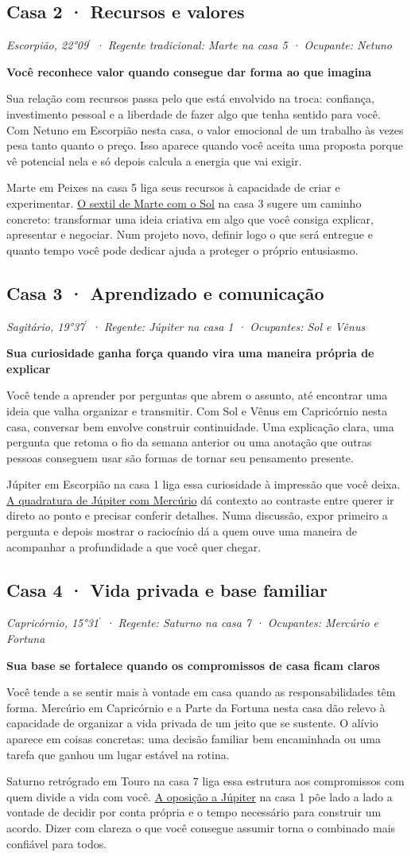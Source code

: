 \documentclass[11pt,a4paper]{article}
\newcommand{\leitura}[3]{\subsection{#1}\textit{#2}\par #3}
\newcommand{\subtituloleitura}[1]{\textbf{#1}\par\nopagebreak[4]}
\newcommand{\aspectoref}[2]{\hyperref[#1]{#2}}
\begin{document}
\leitura{Casa 2 · Recursos e valores}{Escorpião, 22°09\ensuremath{^{\prime}} · Regente tradicional: Marte na casa 5 · Ocupante: Netuno}{
\subtituloleitura{Você reconhece valor quando consegue dar forma ao que imagina}
Sua relação com recursos passa pelo que está envolvido na troca: confiança, investimento pessoal e a liberdade de fazer algo que tenha sentido para você. Com Netuno em Escorpião nesta casa, o valor emocional de um trabalho às vezes pesa tanto quanto o preço. Isso aparece quando você aceita uma proposta porque vê potencial nela e só depois calcula a energia que vai exigir.

Marte em Peixes na casa 5 liga seus recursos à capacidade de criar e experimentar. \aspectoref{aspecto:sol-marte}{O sextil de Marte com o Sol} na casa 3 sugere um caminho concreto: transformar uma ideia criativa em algo que você consiga explicar, apresentar e negociar. Num projeto novo, definir logo o que será entregue e quanto tempo você pode dedicar ajuda a proteger o próprio entusiasmo.
}

\leitura{Casa 3 · Aprendizado e comunicação}{Sagitário, 19°37\ensuremath{^{\prime}} · Regente: Júpiter na casa 1 · Ocupantes: Sol e Vênus}{
\subtituloleitura{Sua curiosidade ganha força quando vira uma maneira própria de explicar}
Você tende a aprender por perguntas que abrem o assunto, até encontrar uma ideia que valha organizar e transmitir. Com Sol e Vênus em Capricórnio nesta casa, conversar bem envolve construir continuidade. Uma explicação clara, uma pergunta que retoma o fio da semana anterior ou uma anotação que outras pessoas conseguem usar são formas de tornar seu pensamento presente.

Júpiter em Escorpião na casa 1 liga essa curiosidade à impressão que você deixa. \aspectoref{aspecto:mercurio-jupiter}{A quadratura de Júpiter com Mercúrio} dá contexto ao contraste entre querer ir direto ao ponto e precisar conferir detalhes. Numa discussão, expor primeiro a pergunta e depois mostrar o raciocínio dá a quem ouve uma maneira de acompanhar a profundidade a que você quer chegar.
}

\leitura{Casa 4 · Vida privada e base familiar}{Capricórnio, 15°31\ensuremath{^{\prime}} · Regente: Saturno na casa 7 · Ocupantes: Mercúrio e Fortuna}{
\subtituloleitura{Sua base se fortalece quando os compromissos de casa ficam claros}
Você tende a se sentir mais à vontade em casa quando as responsabilidades têm forma. Mercúrio em Capricórnio e a Parte da Fortuna nesta casa dão relevo à capacidade de organizar a vida privada de um jeito que se sustente. O alívio aparece em coisas concretas: uma decisão familiar bem encaminhada ou uma tarefa que ganhou um lugar estável na rotina.

Saturno retrógrado em Touro na casa 7 liga essa estrutura aos compromissos com quem divide a vida com você. \aspectoref{aspecto:jupiter-saturno}{A oposição a Júpiter} na casa 1 põe lado a lado a vontade de decidir por conta própria e o tempo necessário para construir um acordo. Dizer com clareza o que você consegue assumir torna o combinado mais confiável para todos.
}
\end{document}
